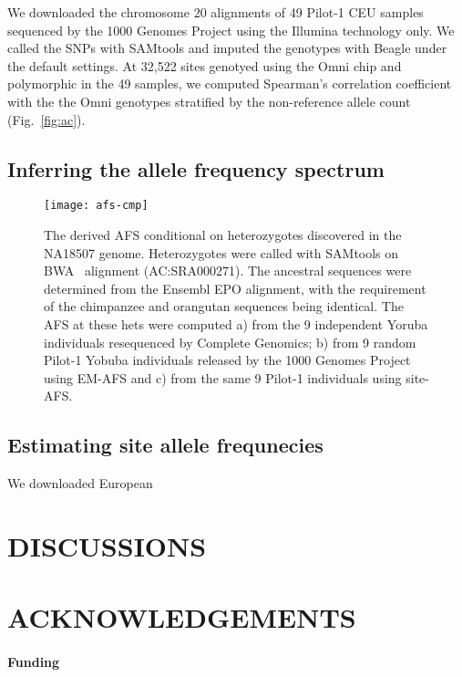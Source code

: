 \documentclass{bioinfo}
\begin{document}
We downloaded the chromosome 20 alignments of 49 Pilot-1 CEU samples sequenced by the 1000 Genomes Project
using the Illumina technology only. We called the SNPs with SAMtools and imputed the genotypes
with Beagle under the default settings. At 32,522 sites genotyed using the Omni chip
and polymorphic in the 49 samples, we computed Spearman's correlation coefficient
with the the Omni genotypes stratified by the non-reference allele count (Fig.~\ref{fig:ac}).

\subsection{Inferring the allele frequency spectrum}
\begin{figure}[tb]
\centering
\texttt{[image: afs-cmp]}
\caption{The derived AFS conditional on heterozygotes discovered in the NA18507
genome. Heterozygotes were called with SAMtools on BWA~\citep{Li:2009uq} alignment
(AC:SRA000271).  The ancestral sequences were determined from the Ensembl EPO
alignment, with the requirement of the chimpanzee and orangutan sequences being
identical.  The AFS at these hets were computed a) from the 9 independent Yoruba
individuals resequenced by Complete Genomics; b) from 9 random Pilot-1 Yobuba
individuals released by the 1000 Genomes Project using EM-AFS and c) from the
same 9 Pilot-1 individuals using site-AFS.}
\end{figure}

\subsection{Estimating site allele frequnecies}
We downloaded European 

\section{DISCUSSIONS}

\section*{ACKNOWLEDGEMENTS}
\paragraph{Funding\textcolon}

\end{document}
